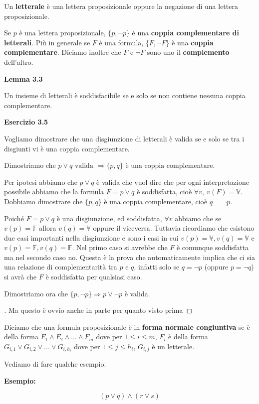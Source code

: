 \begin{flushleft}
Un \textbf{letterale} è una lettera proposizionale oppure la negazione di una 
lettera proposizionale.

Se $p$ è una lettera proposizionale, $\lbrace p, \neg{p} \rbrace$ è una
\textbf{coppia complementare di letterali}. Più in generale se $F$ è una formula, 
$\lbrace F, \neg{F} \rbrace$ è una \textbf{coppia complementare}. Diciamo inoltre
che $F$ e $\neg{F}$ sono uno il \textbf{complemento} dell'altro.

\bigskip

\textbf{Lemma 3.3}

Un insieme di letterali è soddisfacibile se e solo se non contiene nessuna coppia
complementare.

\bigskip

\textbf{Esercizio 3.5}

Vogliamo dimostrare che una disgiunzione di letterali è valida se e solo se tra 
i disgiunti vi è una coppia complementare.

\medskip

Dimostriamo che $p \lor q \text{ valida } \Rightarrow \lbrace p, q \rbrace \text{ è 
una coppia complementare}$.

\smallskip

Per ipotesi abbiamo che $p \lor q$ è valida che vuol dire che per ogni interpretazione 
possibile abbiamo che la formula $F = p \lor q$ è soddisfatta, cioè 
$\forall v, \: v(F) = \mathbb{V}$. Dobbiamo dimostrare che $\lbrace p, q \rbrace$ è 
una coppia complementare, cioè $q = \neg p$.

Poiché $F = p \lor q$ è una disgiunzione, ed soddisfatta, $\forall v$ abbiamo che 
se $v(p) = \mathbb{F}$ allora $v(q) = \mathbb{V}$ oppure il viceversa. Tuttavia ricordiamo
che esistono due casi importanti nella disgiunzione e sono i casi in cui $v(p) = \mathbb{V},
v(q) = \mathbb{V}$ e $v(p) = \mathbb{F}, v(q) = \mathbb{F}$. Nel primo caso si avrebbe che $F$
è comunque soddisfatta ma nel secondo caso no. Questa è la prova che automaticamente
implica che ci sia una relazione di complementarità tra $p$ e $q$, infatti solo se 
$q = \neg p$ (oppure $p = \neg q$) si avrà che $F$ è soddisfatta per qualsiasi caso.

\medskip

Dimostriamo ora che $\lbrace p, \neg p \rbrace \Rightarrow p \lor \neg p$ è valida.

\begin{proof}[\unskip\nopunct]
Ma questo è ovvio anche in parte per quanto visto prima
\end{proof}

\bigskip

Diciamo che una formula proposizionale è in \textbf{forma normale congiuntiva} se
è della forma $F_1 \land F_2 \land ... \land F_m$ dove per $1 \le i \le m$, $F_i$
è della forma $G_{i,1} \lor G_{i,2} \lor ... \lor G_{i,h_i}$ dove per 
$1 \le j \le h_i$, $G_{i, j}$ è un letterale.

\bigskip

Vediamo di fare qualche esempio:

\textbf{Esempio:}

\[(p \lor q) \land (r \lor s)\]

\end{flushleft}